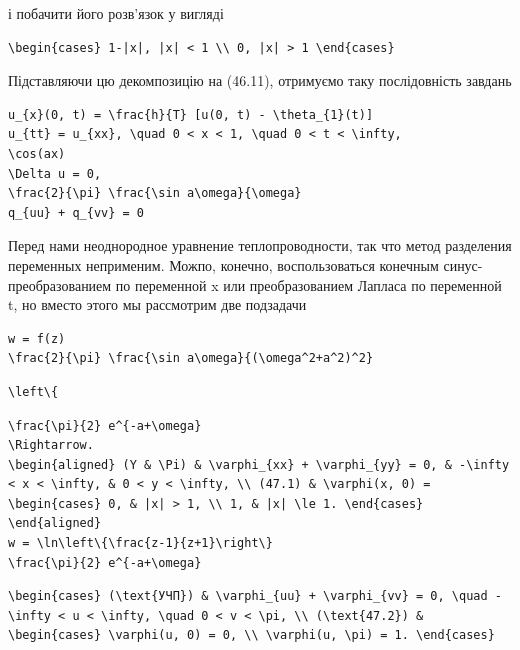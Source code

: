 \documentclass[
  ukrainian,
]{article}
\begin{document}
і побачити його розв'язок у вигляді

\begin{verbatim}
\begin{cases} 1-|x|, |x| < 1 \\ 0, |x| > 1 \end{cases}
\end{verbatim}

Підставляючи цю декомпозицію на (46.11), отримуємо таку послідовність
завдань

\begin{verbatim}
u_{x}(0, t) = \frac{h}{T} [u(0, t) - \theta_{1}(t)]
u_{tt} = u_{xx}, \quad 0 < x < 1, \quad 0 < t < \infty,
\cos(ax)
\Delta u = 0,
\frac{2}{\pi} \frac{\sin a\omega}{\omega}
q_{uu} + q_{vv} = 0
\end{verbatim}

Перед нами неоднородное уравнение теплопроводности, так что метод
разделения переменных неприменим. Можпо, конечно, воспользоваться
конечным синус-преобразованием по переменной x или преобразованием
Лапласа по переменной t, но вместо этого мы рассмотрим две подзадачи

\begin{verbatim}
w = f(z)
\frac{2}{\pi} \frac{\sin a\omega}{(\omega^2+a^2)^2}
\end{verbatim}

\begin{verbatim}
\left\{
\end{verbatim}

\begin{verbatim}
\frac{\pi}{2} e^{-a+\omega}
\Rightarrow.
\begin{aligned} (Y & \Pi) & \varphi_{xx} + \varphi_{yy} = 0, & -\infty < x < \infty, & 0 < y < \infty, \\ (47.1) & \varphi(x, 0) = \begin{cases} 0, & |x| > 1, \\ 1, & |x| \le 1. \end{cases} \end{aligned}
w = \ln\left\{\frac{z-1}{z+1}\right\}
\frac{\pi}{2} e^{-a+\omega}
\end{verbatim}

\begin{verbatim}
\begin{cases} (\text{УЧП}) & \varphi_{uu} + \varphi_{vv} = 0, \quad -\infty < u < \infty, \quad 0 < v < \pi, \\ (\text{47.2}) & \begin{cases} \varphi(u, 0) = 0, \\ \varphi(u, \pi) = 1. \end{cases}
\end{verbatim}
\end{document}
